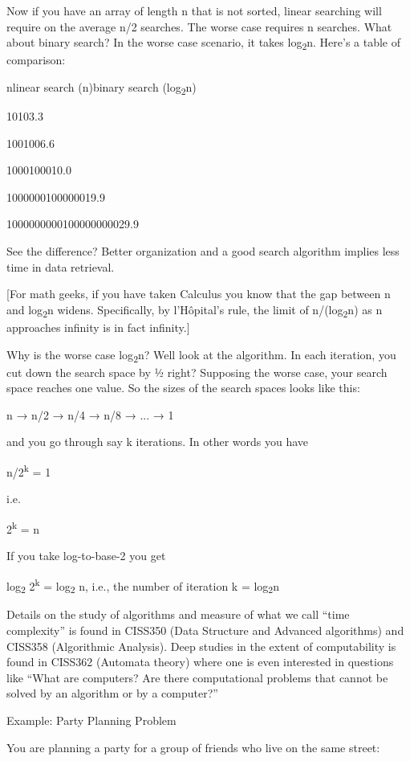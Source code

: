 \documentclass[
]{article}
\begin{document}
\hfill\break
Now if you have an array of length n that is not sorted, linear
searching will require on the average n/2 searches. The worse case
requires n searches. What about binary search? In the worse case
scenario, it takes log\textsubscript{2}n. Here's a table of comparison:

nlinear search (n)binary search (log\textsubscript{2}n)

10103.3

1001006.6

1000100010.0

1000000100000019.9

1000000000100000000029.9

See the difference? Better organization and a good search algorithm
implies less time in data retrieval.

{[}For math geeks, if you have taken Calculus you know that the gap
between n and log\textsubscript{2}n widens. Specifically, by l'Hôpital's
rule, the limit of n/(log\textsubscript{2}n) as n approaches infinity is
in fact infinity.{]}

Why is the worse case log\textsubscript{2}n? Well look at the algorithm.
In each iteration, you cut down the search space by ½ right? Supposing
the worse case, your search space reaches one value. So the sizes of the
search spaces looks like this:

n → n/2 → n/4 → n/8 → ... → 1

and you go through say k iterations. In other words you have

n/2\textsuperscript{k} = 1

i.e.

2\textsuperscript{k} = n

If you take log-to-base-2 you get

log\textsubscript{2 }2\textsuperscript{k} = log\textsubscript{2 }n,
i.e., the number of iteration k = log\textsubscript{2}n

Details on the study of algorithms and measure of what we call ``time
complexity'' is found in CISS350 (Data Structure and Advanced
algorithms) and CISS358 (Algorithmic Analysis). Deep studies in the
extent of computability is found in CISS362 (Automata theory) where one
is even interested in questions like ``What are computers? Are there
computational problems that cannot be solved by an algorithm or by a
computer?''

Example: Party Planning Problem

You are planning a party for a group of friends who live on the same
street:
\end{document}
